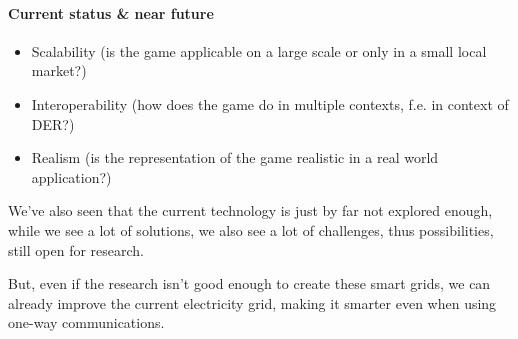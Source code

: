 \paragraph{Current status \& near future}


\begin{itemize}
	\item Scalability (is the game applicable on a large scale or only in a small local market?)
	\item Interoperability (how does the game do in multiple contexts, f.e. in context of DER?)
	\item Realism (is the representation of the game realistic in a real world application?)
\end{itemize}



We've also seen that the current technology is just by far not explored enough, while we see a lot of solutions, we also see a lot of challenges, thus possibilities, still open for research. 

But, even if the research  isn't good enough to create these smart grids, we can already improve the current electricity grid, making it smarter even when using one-way communications. \cite{AgarwalCui2012}


